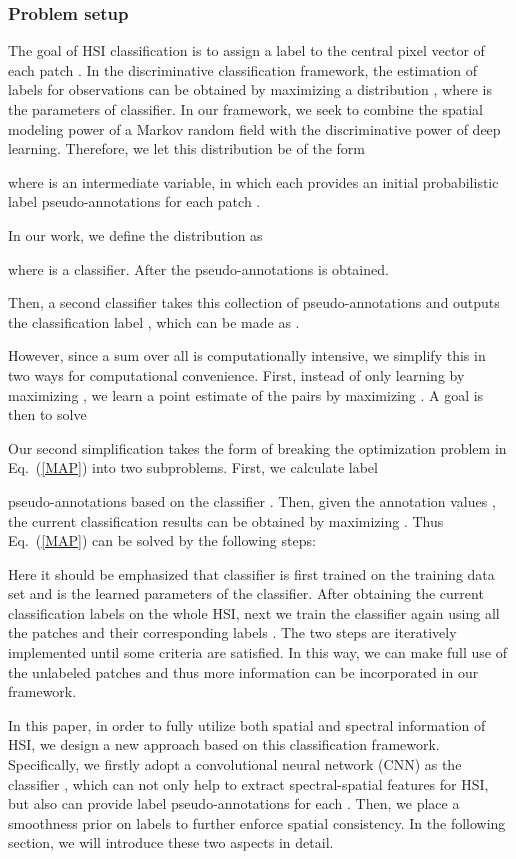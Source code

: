 \documentclass[journal]{IEEEtran}
\begin{document}
	\subsubsection{Problem setup} The goal of HSI classification is to assign a label  to {{the central pixel vector of}} each patch . In the discriminative classification framework, the estimation of labels  for observations  can be obtained by maximizing a distribution , {{where  is the parameters of classifier.}} In our framework, we seek to combine the spatial modeling power of a Markov random field with the discriminative power of deep learning. Therefore, we let this distribution be of the form 
	
	where  is an intermediate variable, in which each  provides an initial probabilistic label {{pseudo-annotations}} for each patch . {{In our work, we define the distribution  as
	
	where  is a classifier. After the pseudo-annotations  is obtained.}} Then, a second classifier  takes this collection of {{pseudo-annotations }} and outputs the {{classification label}} , which can be made as .
	
	However, since a sum over all  is computationally intensive, we simplify this in two ways for computational convenience. First, instead of only learning  {{by maximizing }}, we learn a point estimate of the pairs  {{by maximizing }}. A goal is then to solve
	
	Our second simplification takes the form of breaking the optimization problem in Eq.\ (\ref{MAP}) into two subproblems. First, we calculate label {{pseudo-annotations  based on the classifier . Then, given the annotation values , the {{current classification results }} can be obtained by maximizing . Thus Eq.\ (\ref{MAP}) can be solved by the following steps:
	
	
	Here it should be emphasized that classifier  is first trained on the training data set  and  is the learned parameters of the classifier. After obtaining the current classification labels  on the whole HSI, next we train the classifier again using all the patches  and their corresponding labels . The two steps are iteratively implemented until some criteria are satisfied. In this way, we can make full use of the unlabeled patches and thus more information can be incorporated in our framework.}}
	
	In this paper, in order to fully utilize both spatial and spectral information of HSI, we design a new approach based on this classification framework. Specifically, we firstly {{adopt a convolutional neural network (CNN) as the classifier , which can not only help to extract spectral-spatial features for HSI, but also can provide label pseudo-annotations  for each . Then, we place a smoothness prior on labels  to further enforce spatial consistency. In the following section, we will introduce these two aspects in detail.}} 
	
\end{document}
